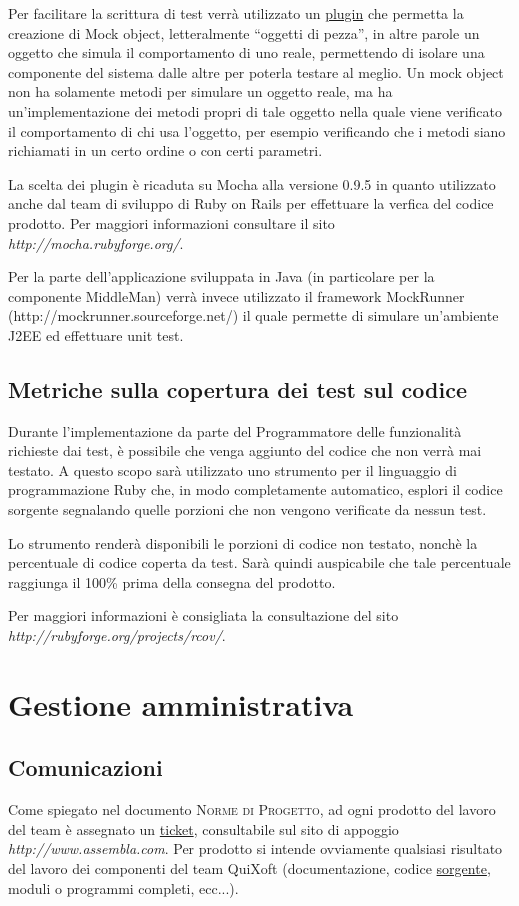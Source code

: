 \documentclass[11pt,a4paper]{article}
\begin{document}
Per facilitare la scrittura di test verrà utilizzato un \underline{plugin} che permetta la creazione di Mock object, letteralmente ``oggetti di pezza'', in altre parole un oggetto che simula il comportamento di uno reale, permettendo di isolare una componente del sistema dalle altre per poterla testare al meglio. Un mock object non ha solamente metodi per simulare un oggetto reale, ma ha un'implementazione dei metodi propri di tale oggetto nella quale viene verificato il comportamento di chi usa l'oggetto, per esempio verificando che i metodi siano richiamati in un certo ordine o con certi parametri.

La scelta dei plugin è ricaduta su Mocha alla versione 0.9.5 in quanto utilizzato anche dal team di sviluppo di Ruby on Rails per effettuare la verfica del codice prodotto. Per maggiori informazioni consultare il sito \textit{http://mocha.rubyforge.org/}.

Per la parte dell'applicazione sviluppata in Java (in particolare per la componente MiddleMan) verrà invece utilizzato il framework MockRunner (http://mockrunner.sourceforge.net/) il quale permette di simulare un'ambiente J2EE ed effettuare unit test.

\subsection{Metriche sulla copertura dei test sul codice}
Durante l'implementazione da parte del Programmatore delle funzionalità richieste dai test, è possibile che venga aggiunto del codice che non verrà mai testato. A questo scopo sarà utilizzato uno strumento per il linguaggio di programmazione Ruby che, in modo completamente automatico, esplori il codice sorgente segnalando quelle porzioni che non vengono verificate da nessun test.

Lo strumento renderà disponibili le porzioni di codice non testato, nonchè la percentuale di codice coperta da test. Sarà quindi auspicabile che tale percentuale raggiunga il 100\% prima della consegna del prodotto.

Per maggiori informazioni è consigliata la consultazione del sito \\ \textit{http://rubyforge.org/projects/rcov/}.

\section{Gestione amministrativa}
\subsection{Comunicazioni}
Come spiegato nel documento \textsc{Norme di Progetto}, ad ogni prodotto del lavoro del team è assegnato un \underline{ticket}, consultabile sul sito di appoggio \textit{http://www.assembla.com}. Per prodotto si intende ovviamente qualsiasi risultato del lavoro dei componenti del team QuiXoft (documentazione, codice \underline{sorgente}, moduli o programmi completi, ecc...).
\end{document}
